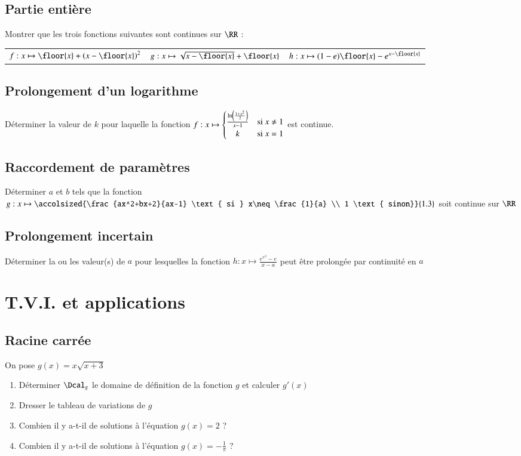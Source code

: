 \documentclass[oneside,12pt]{article}          %
\begin{document}
\subsection{Partie entière}
Montrer que les trois fonctions suivantes sont continues sur $\RR$ :\\
\begin{tabular}{p{} p{} p{}}
    $f:x\mapsto\floor{x}+\left(x-\floor{x}\right)^2$ & $g:x\mapsto\sqrt{x-\floor{x}}+\floor{x}$ & $h:x\mapsto(1-e)\floor{x}-e^{x-\floor{x}}$
\end{tabular}



\subsection{Prolongement d'un logarithme}
Déterminer la valeur de $k$ pour laquelle la fonction $f:x\mapsto\begin{cases}\frac{\ln\left(\frac{1+x^2}{2}\right)}{x-1} & \text{si } x\neq1 \\ \hfil k & \text{si } x=1 \end{cases}$ \quad est continue.



\subsection{Raccordement de paramètres}
Déterminer $a$ et $b$ tels que la fonction $g:x\mapsto\accolsized{\frac{ax^2+bx+2}{ax-1} \text{ si } x\neq\frac{1}{a} \\ 1 \text{ sinon}}{1.3}$ soit continue sur $\RR$



\subsection{Prolongement incertain}
Déterminer la ou les valeur(s) de $a$ pour lesquelles la fonction $h:x\mapsto\frac{e^{x^2}-e}{x-a}$ peut être prolongée par continuité en $a$




\section{T.V.I. et applications}

\subsection{Racine carrée}
On pose $g(x)=x\sqrt{x+3}$
\begin{enumerate}
    \item Déterminer $\Dcal_g$ le domaine de définition de la fonction $g$ et calculer $g'(x)$
    \item Dresser le tableau de variations de $g$
    \item Combien il y a-t-il de solutions à l'équation $g(x)=2$ ?
    \item Combien il y a-t-il de solutions à l'équation $g(x)=-\frac{1}{\pi}$ ?
\end{enumerate}
\end{document}
